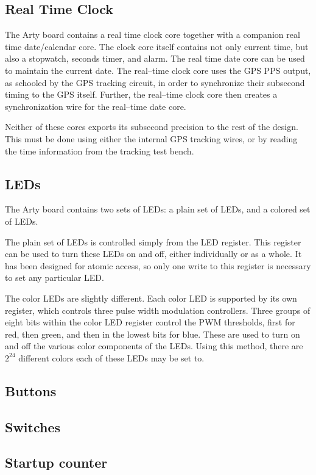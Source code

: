 \documentclass{gqtekspec}
\begin{document}
\subsection{Real Time Clock}

The Arty board contains a real time clock core together with a companion
real time date/calendar core.  The clock core itself contains not only current
time, but also a stopwatch, seconds timer, and alarm.  The real time date core
can be used to maintain the current date.  The real--time clock core uses the
GPS PPS output, as schooled by the GPS tracking circuit, in order to synchronize
their subsecond timing to the GPS itself.  Further, the real--time clock core
then creates a synchronization wire for the real--time date core.

Neither of these cores exports its subsecond precision to the rest of the
design.  This must be done using either the internal GPS tracking wires, or
by reading the time information from the tracking test bench.

\subsection{LEDs}

The Arty board contains two sets of LEDs: a plain set of LEDs, and a colored
set of LEDs.

The plain set of LEDs is controlled simply from the LED register.  This register
can be used to turn these LEDs on and off, either individually or as a whole.
It has been designed for atomic access, so only one write to this register
is necessary to set any particular LED.

The color LEDs are slightly different.  Each color LED is supported by its
own register, which controls three pulse width modulation controllers.  Three
groups of eight bits within the color LED register control the PWM thresholds,
first for red, then green, and then in the lowest bits for blue.  These are
used to turn on and off the various color components of the LEDs.  Using this
method, there are $2^{24}$ different colors each of these LEDs may be set
to.  

\subsection{Buttons}
\subsection{Switches}
\subsection{Startup counter}
\end{document}
